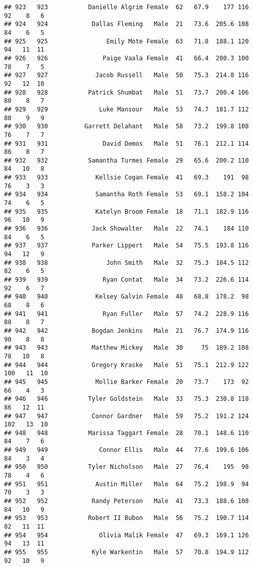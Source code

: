 \documentclass[
]{article}
\begin{document}
\begin{verbatim}
## 923   923           Danielle Algrim Female  62   67.9    177 116  92    8   6
## 924   924            Dallas Fleming   Male  21   73.6  205.6 108  84    6   5
## 925   925                Emily Mote Female  63   71.8  188.1 120  94   11  11
## 926   926               Paige Vaala Female  41   66.4  200.3 100  78    7   5
## 927   927             Jacob Russell   Male  50   75.3  214.8 116  92   12  10
## 928   928           Patrick Shumbat   Male  51   73.7  200.4 106  80    8   7
## 929   929              Luke Mansour   Male  53   74.7  181.7 112  80    9   9
## 930   930          Garrett Delahant   Male  58   73.2  199.8 108  76    7   7
## 931   931               David Demos   Male  51   76.1  212.1 114  86    8   7
## 932   932           Samantha Turmes Female  29   65.6  200.2 110  84   10   8
## 933   933             Kellsie Cogan Female  41   69.3    191  98  76    3   3
## 934   934             Samantha Roth Female  53   69.1  158.2 104  74    6   5
## 935   935             Katelyn Broom Female  18   71.1  182.9 116  96   10   9
## 936   936            Jack Showalter   Male  22   74.1    184 110  84    6   5
## 937   937            Parker Lippert   Male  54   75.5  193.8 116  94   12   9
## 938   938                John Smith   Male  32   75.3  184.5 112  82    6   5
## 939   939               Ryan Contat   Male  34   73.2  226.6 114  92    6   7
## 940   940             Kelsey Galvin Female  48   68.8  178.2  98  68    8   6
## 941   941               Ryan Fuller   Male  57   74.2  228.9 116  88    8   7
## 942   942            Bogdan Jenkins   Male  21   76.7  174.9 116  90    8   8
## 943   943            Matthew Mickey   Male  30     75  189.2 108  78   10   8
## 944   944            Gregory Kraske   Male  51   75.1  212.9 122 100   11  10
## 945   945             Mollie Barker Female  20   73.7    173  92  66    4   3
## 946   946           Tyler Goldstein   Male  33   75.3  230.8 118  86   12  11
## 947   947            Connor Gardner   Male  59   75.2  191.2 124 102   13  10
## 948   948           Marissa Taggart Female  28   70.1  148.6 110  84    7   6
## 949   949              Connor Ellis   Male  44   77.6  199.6 106  84    3   4
## 950   950           Tyler Nicholson   Male  27   76.4    195  98  78    4   6
## 951   951             Austin Miller   Male  64   75.2  198.9  94  70    3   3
## 952   952            Randy Peterson   Male  41   73.3  188.6 108  84   10   9
## 953   953           Robert II Bubon   Male  56   75.2  190.7 114  82   11  11
## 954   954              Olivia Malik Female  47   69.3  169.1 126  94   13  11
## 955   955            Kyle Warkentin   Male  57   70.8  194.9 112  92   10   9

\end{verbatim}
\end{document}

